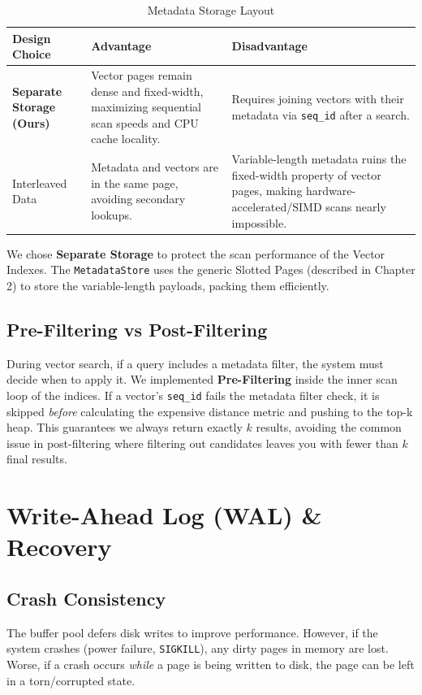 \documentclass[12pt, a4paper]{report}
\begin{document}
\begin{table}[h]
\centering
\begin{tabularx}{\textwidth}{lXX}
\toprule
\textbf{Design Choice} & \textbf{Advantage} & \textbf{Disadvantage} \\
\midrule
\textbf{Separate Storage (Ours)} &
    Vector pages remain dense and fixed-width, maximizing sequential scan speeds and CPU cache locality. &
    Requires joining vectors with their metadata via \texttt{seq\_id} after a search. \\
\addlinespace
Interleaved Data &
    Metadata and vectors are in the same page, avoiding secondary lookups. &
    Variable-length metadata ruins the fixed-width property of vector pages, making hardware-accelerated/SIMD scans nearly impossible. \\
\bottomrule
\end{tabularx}
\caption{Metadata Storage Layout}
\end{table}

We chose \textbf{Separate Storage} to protect the scan performance of the Vector Indexes. The \texttt{MetadataStore} uses the generic Slotted Pages (described in Chapter 2) to store the variable-length payloads, packing them efficiently.

\section{Pre-Filtering vs Post-Filtering}
During vector search, if a query includes a metadata filter, the system must decide when to apply it.
We implemented \textbf{Pre-Filtering} inside the inner scan loop of the indices. If a vector's \texttt{seq\_id} fails the metadata filter check, it is skipped \textit{before} calculating the expensive distance metric and pushing to the top-k heap. This guarantees we always return exactly $k$ results, avoiding the common issue in post-filtering where filtering out candidates leaves you with fewer than $k$ final results.


\chapter{Write-Ahead Log (WAL) \& Recovery}

\section{Crash Consistency}
The buffer pool defers disk writes to improve performance. However, if the system crashes (power failure, \texttt{SIGKILL}), any dirty pages in memory are lost. Worse, if a crash occurs \textit{while} a page is being written to disk, the page can be left in a torn/corrupted state.
\end{document}
